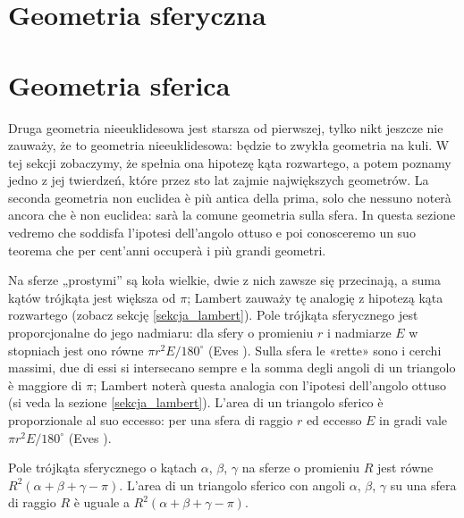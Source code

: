 \section{Geometria sferyczna} %
\section{Geometria sferica} %
\label{sekcja_sferyczna}

Druga geometria nieeuklidesowa jest starsza od pierwszej, tylko nikt jeszcze nie zauważy, że to geometria nieeuklidesowa: będzie to zwykła geometria na kuli. %
W tej sekcji zobaczymy, że spełnia ona hipotezę kąta rozwartego, a potem poznamy jedno z jej twierdzeń, które przez sto lat zajmie największych geometrów. %
La seconda geometria non euclidea è più antica della prima, solo che nessuno noterà ancora che è non euclidea: sarà la comune geometria sulla sfera. %
In questa sezione vedremo che soddisfa l'ipotesi dell'angolo ottuso e poi conosceremo un suo teorema che per cent'anni occuperà i più grandi geometri. %

Na sferze „prostymi'' są koła wielkie, dwie z nich zawsze się przecinają, a suma kątów trójkąta jest większa od $\pi$; Lambert zauważy tę analogię z hipotezą kąta rozwartego \cite[s. 286]{eves1_1972} (zobacz sekcję \ref{sekcja_lambert}). %
Pole trójkąta sferycznego jest proporcjonalne do jego nadmiaru: dla sfery o promieniu $r$ i nadmiarze $E$ w stopniach jest ono równe $\pi r^2 E/180^\circ$ (Eves \cite[s. 289--290, zad. 10]{eves1_1972}). %
Sulla sfera le «rette» sono i cerchi massimi, due di essi si intersecano sempre e la somma degli angoli di un triangolo è maggiore di $\pi$; Lambert noterà questa analogia con l'ipotesi dell'angolo ottuso \cite[p. 286]{eves1_1972} (si veda la sezione \ref{sekcja_lambert}). %
L'area di un triangolo sferico è proporzionale al suo eccesso: per una sfera di raggio $r$ ed eccesso $E$ in gradi vale $\pi r^2 E/180^\circ$ (Eves \cite[p. 289--290, es. 10]{eves1_1972}). %

\begin{theorem}
[Girarda] %
[di Girard] %
	Pole trójkąta sferycznego o kątach $\alpha$, $\beta$, $\gamma$ na sferze o promieniu $R$ jest równe $R^2(\alpha + \beta + \gamma - \pi)$. %
	L'area di un triangolo sferico con angoli $\alpha$, $\beta$, $\gamma$ su una sfera di raggio $R$ è uguale a $R^2(\alpha + \beta + \gamma - \pi)$. %
\end{theorem}


